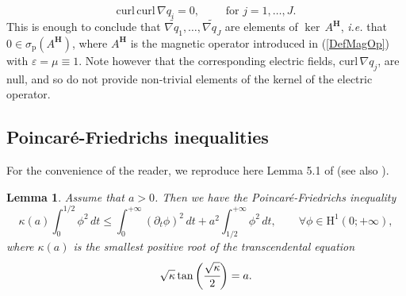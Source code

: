 \documentclass[11pt,a4paper]{article}
\newcommand{\eps}{\varepsilon}
\newcommand{\mrm}[1]{\mathrm{#1}}
\newcommand{\mH}{\mrm{H}}
\newcommand{\curlvec}{\boldsymbol{\mrm{curl}}\,}
\def\H{\boldsymbol{H}}
\newtheorem{lemma}[theorem]{Lemma}
\begin{document}
\[
\curlvec\curlvec\nabla q_i=0,\qquad \mbox{ for }j=1,\dots, J.
\]
This is enough to conclude that $\widetilde{\nabla q_1},\dots,\widetilde{\nabla q_J}$ are elements of $\ker\,A^{\H}$, \textit{i.e.} that $0\in\sigma_{\mrm{p}}(A^{\H})$, where $A^{\H}$ is the magnetic operator introduced in (\ref{DefMagOp}) with $\eps=\mu\equiv1$. Note however that the corresponding electric fields, $\curlvec\nabla q_j$, are null, and so do not provide non-trivial elements of the kernel of the electric operator. 







\subsection{Poincar\'e-Friedrichs inequalities}
For the convenience of the reader, we reproduce here Lemma 5.1 of \cite{BaMaNa17} (see also \cite[Lem.\,A.1]{ChNa23}).
\begin{lemma}
Assume that $a>0$. Then we have the Poincar\'e-Friedrichs inequality 
\begin{equation}\label{Fried_ineq}
 \kappa(a)\int_{0}^{1/2}\phi^2\,dt \le \int_{0}^{+\infty}(\partial_t\phi)^2\,dt+a^2\int_{1/2}^{+\infty}\phi^2\,dt,\qquad \forall \phi\in\mH^1(0;+\infty),
\end{equation}
where $\kappa(a)$ is the smallest positive root of the transcendental equation
\begin{equation}\label{TransEqnLemma}
\sqrt{\kappa}\tan\bigg(\cfrac{\sqrt{\kappa}}{2}\bigg)=a.
\end{equation}
\end{lemma}
\end{document}
